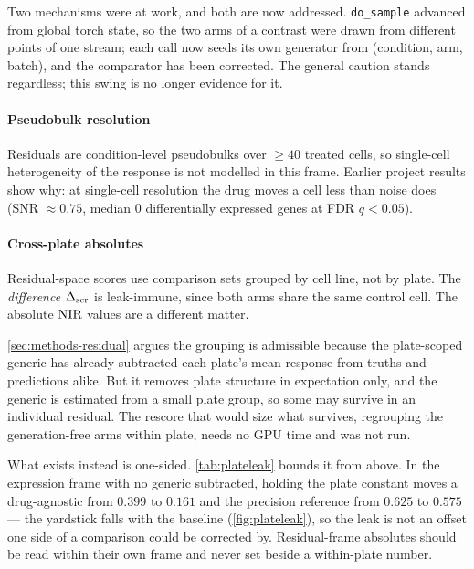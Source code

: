 Two mechanisms were at work, and both are now addressed. \texttt{do\_sample}
advanced from global torch state, so the two arms of a contrast were drawn from
different points of one
stream; each call now seeds its own generator from (condition, arm, batch), and
the comparator has been corrected. The general caution stands regardless; this
swing is no longer evidence for it.

\paragraph{Pseudobulk resolution} Residuals are condition-level pseudobulks over
$\geq 40$ treated cells, so single-cell heterogeneity of the response is not
modelled in this frame. Earlier project results show why: at single-cell
resolution the drug moves a cell less than noise does (SNR $\approx 0.75$,
median $0$ differentially expressed genes at FDR $q<0.05$).

\paragraph{Cross-plate absolutes} Residual-space scores use comparison sets
grouped by cell line, not by plate. The \emph{difference} $\Delta_{\textrm{scr}}$ is leak-immune,
since both arms share the same control cell. The absolute $\textrm{NIR}$ values are a
different matter.

\cref{sec:methods-residual} argues the grouping is admissible because the
plate-scoped generic has already subtracted each plate's mean response from
truths and predictions alike. But it removes plate structure in expectation
only, and the generic is estimated from a small plate group, so some may survive
in an individual residual. The rescore that would size what survives, regrouping
the generation-free arms within plate, needs no GPU time and was not run.

What exists instead is one-sided. \cref{tab:plateleak} bounds it from
above. In the expression frame with no
generic subtracted, holding the plate constant moves a drug-agnostic
 from
$0.399$ to $0.161$ and the precision reference from $0.625$ to $0.575$ --- the
yardstick falls with the baseline (\cref{fig:plateleak}), so the leak is not an
offset one side of a comparison could be corrected by.
Residual-frame absolutes should be read within their own frame and never set
beside a within-plate number.

